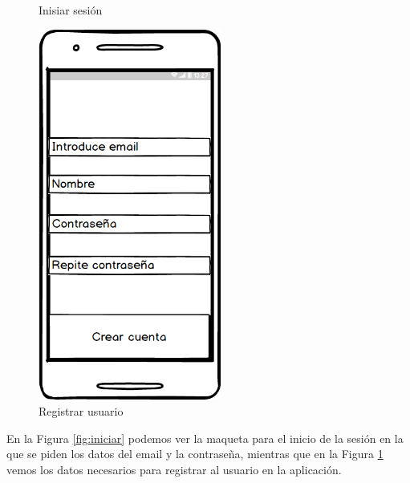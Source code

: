 \begin{figure}[htbp]
\begin{minipage}[b]{0.5\linewidth}
\caption{Inisiar sesión}
\label{fig:iniciar}
\end{minipage}
\hspace{0.5cm} %
\begin{minipage}[b]{0.5\linewidth}
\centering
\includegraphics[width=6cm]{maqueta/Registrarse.png}
 
\caption{Registrar usuario}
\label{fig:regis}
\end{minipage}

\end{figure}

En la Figura \ref{fig:iniciar}  podemos ver la maqueta para el inicio de la sesión en la que se piden los datos del email y la contraseña, mientras que en la Figura \ref{fig:regis} vemos los datos necesarios para registrar al usuario en la aplicación.







